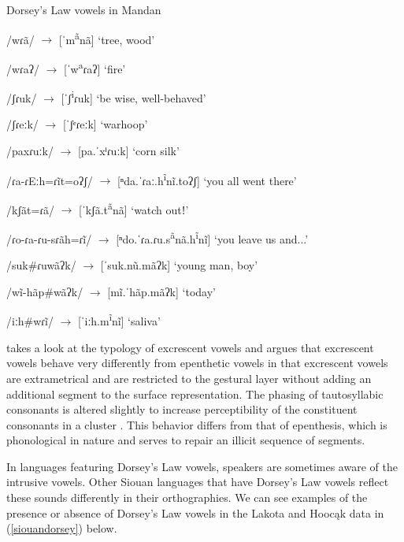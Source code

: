 \begin{exe}
\item\label{dorseyslaw1} Dorsey's Law vowels in Mandan
	\begin{xlist}
	\item\label{dorseyslaw1a} /wɾã/ $\to$ [ˈm\textsuperscript{ã}nã] `tree, wood'
	\item\label{dorseyslaw1b} /wɾaʔ/ $\to$ [ˈw\textsuperscript{a}ɾaʔ] `fire'
	\item\label{dorseyslaw1c} /ʃɾuk/ $\to$ [ˈʃ\textsuperscript{i}ɾuk] `be wise, well-behaved'
	\item\label{dorseyslaw1d} /ʃɾeːk/ $\to$ [ˈʃᵉɾeːk] `warhoop'
	\item\label{dorseyslaw1e} /paxɾuːk/ $\to$ [pa.ˈxⁱɾuːk] `corn silk'
	\item\label{dorseyslaw1f} /ɾa-ɾEːh=ɾĩt=oʔʃ/ $\to$ [ⁿda.ˈɾaː.h\textsuperscript{ĩ}nĩ.toʔʃ] `you all went there'
	\item\label{dorseyslaw1g} /kʃãt=ɾã/ $\to$ [ˈkʃã.t\textsuperscript{ã}nã] `watch outǃ'
	\item\label{dorseyslaw1h} /ɾo-ɾa-ɾu-sɾãh=ɾĩ/ $\to$ [ⁿdo.ˈɾa.ɾu.s\textsuperscript{ã}nã.h\textsuperscript{ĩ}nĩ] `you leave us and...'
	\item\label{dorseyslaw1i} /suk\#ɾuwãʔk/ $\to$ [ˈsuk.nũ.mãʔk] `young man, boy'
	\item\label{dorseyslaw1j} /wĩ-hãp\#wãʔk/ $\to$ [mĩ.ˈhãp.mãʔk] `today'
	\item\label{dorseyslaw1k} /iːh\#wɾĩ/ $\to$ [ˈiːh.m\textsuperscript{ĩ}nĩ] `saliva'
	\end{xlist}
\end{exe}

\citet[388]{hall2006} takes a look at the typology of excrescent vowels and argues that excrescent vowels behave very differently from epenthetic vowels in that excrescent vowels are extrametrical and are restricted to the gestural layer without adding an additional segment to the surface representation. The phasing of tautosyllabic consonants is altered slightly to increase perceptibility of the constituent consonants in a cluster \citep{silverman1995,wright1996,chitoranetal2002}. This behavior differs from that of epenthesis, which is phonological in nature and serves to repair an illicit sequence of segments.

In languages featuring Dorsey's Law vowels, speakers are sometimes aware of the intrusive vowels. Other Siouan languages that have Dorsey's Law vowels reflect these sounds differently in their orthographies. We can see examples of the presence or absence of Dorsey's Law vowels in the Lakota and Hoocąk data in (\ref{siouandorsey}) below.

